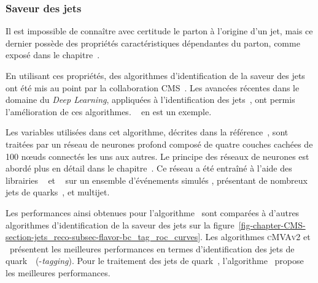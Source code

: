 \subsubsection{Saveur des jets}\label{chapter-CMS-section-jets_reco-subsec-flavor}
Il est impossible de connaître avec certitude le parton à l'origine d'un jet,
mais ce dernier possède des propriétés caractéristiques dépendantes du parton, comme exposé dans le chapitre~.
\par
En utilisant ces propriétés, des algorithmes d'identification de la saveur des jets ont été mis au point par la collaboration CMS~\cite{jet_btag_CSV_RunI}.
Les avancées récentes dans le domaine du \emph{Deep Learning}, appliquées à l'identification des jets~\cite{jet_flavor_deep_nn}, ont permis l'amélioration de ces algorithmes.
\DeepCSV~\cite{Sirunyan_heavy_flavor_jets_2018} en est un exemple.
\par Les variables utilisées dans cet algorithme, décrites dans la référence~\cite{Sirunyan_heavy_flavor_jets_2018},
sont traitées par un réseau de neurones profond composé de quatre couches cachées de 100 nœuds connectés les uns aux autres.
Le principe des réseaux de neurones est abordé plus en détail dans le chapitre~.
Ce réseau a été entraîné à l'aide des librairies
\KERAS~\cite{keras}
et
\TENSORFLOW~\cite{tensorflow}
sur un ensemble d'événements simulés \ttbar, présentant de nombreux jets de quarks~\quarkb, et multijet.
\par Les performances ainsi obtenues pour l'algorithme \DeepCSV\ sont comparées à d'autres algorithmes d'identification de la saveur des jets sur la figure~\ref{fig-chapter-CMS-section-jets_reco-subsec-flavor-bc_tag_roc_curves}.
Les algorithmes \textsc{cMVAv2} et \DeepCSV\ présentent les meilleures performances en termes d'identification des jets de quark~\quarkb\ (\quarkb-\emph{tagging}).
Pour le traitement des jets de quark~\quarkc, l'algorithme \DeepCSV\ propose les meilleures performances.
